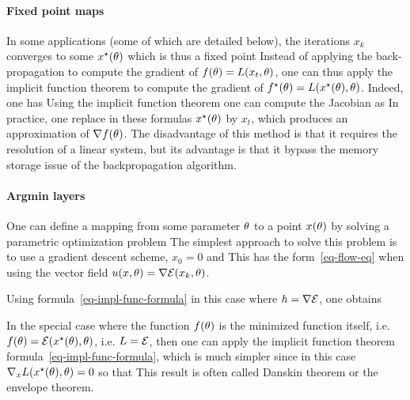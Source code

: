 \paragraph{Fixed point maps}

In some applications (some of which are detailed below), the iterations $x_k$ converges to some $x^\star(\theta)$ which is thus a fixed point 
Instead of applying the back-propagation to compute the gradient of $f(\theta) = L(x_t,\theta)$, one can thus apply the implicit function theorem to compute the gradient of $f^\star(\theta) = L(x^\star(\theta),\theta)$. Indeed, one has
Using the implicit function theorem one can compute the Jacobian as
In practice, one replace in these formulas $x^\star(\theta)$ by $x_t$, which produces an approximation of $\nabla f(\theta)$. 
%
The disadvantage of this method is that it requires the resolution of a linear system, but its advantage is that it bypass the memory storage issue of the backpropagation algorithm.



\paragraph{Argmin layers}

One can define a mapping from some parameter $\theta$ to a point $x(\theta)$ by solving a parametric optimization problem
The simplest approach to solve this problem is to use a gradient descent scheme, $x_0=0$ and
This has the form~\eqref{eq-flow-eq} when using the vector field $u(x,\theta) = \nabla \mathcal{E}(x_k,\theta)$. 

Using formula~\eqref{eq-impl-func-formula} in this case where $h=\nabla \mathcal{E}$, one obtains

In the special case where the function $f(\theta)$ is the minimized function itself, i.e. $f(\theta)=\mathcal{E}(x^\star(\theta),\theta)$, i.e. $L=\mathcal{E}$, then one can apply the implicit function theorem formula~\eqref{eq-impl-func-formula}, which is much simpler since in this case $\nabla_x L(x^\star(\theta),\theta)=0$ so that 
This result is often called Danskin theorem or the envelope theorem. 


